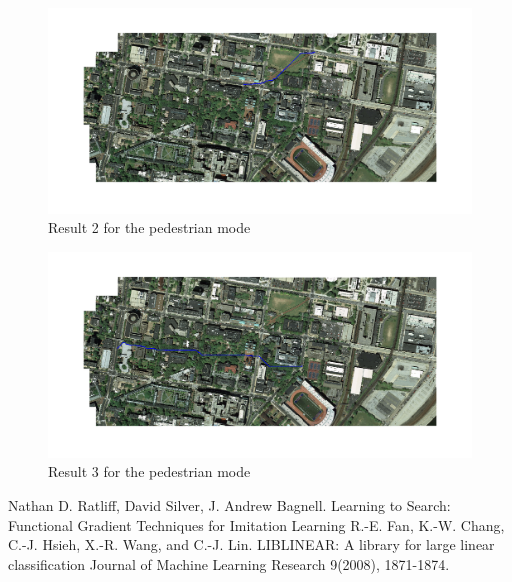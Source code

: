 \documentclass[english]{article}
\begin{document}
\begin{figure}[thpb]
\centering
\includegraphics[width=\textwidth]{ped_3}
\caption{Result 2 for the pedestrian mode}
\end{figure}

\begin{figure}[thpb]
\centering
\includegraphics[width=\textwidth]{ped_5}
\caption{Result 3 for the pedestrian mode}
\end{figure}
 




%

\begin{thebibliography}{99}
 Nathan D. Ratliff, David Silver, J. Andrew Bagnell. Learning to Search: Functional Gradient Techniques for Imitation Learning
 R.-E. Fan, K.-W. Chang, C.-J. Hsieh, X.-R. Wang, and C.-J. Lin. LIBLINEAR: A library for large linear classification Journal of Machine Learning Research 9(2008), 1871-1874.
\end{thebibliography}
\end{document}
